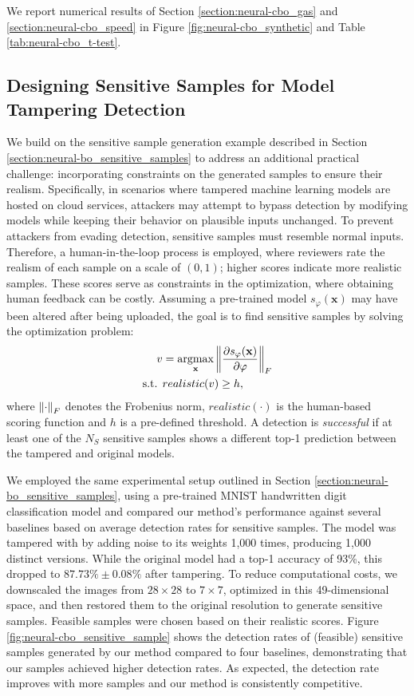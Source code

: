We report numerical results of Section \ref{section:neural-cbo_gas} and  \ref{section:neural-cbo_speed} in Figure \ref{fig:neural-cbo_synthetic} and Table \ref{tab:neural-cbo_t-test}.
\subsection{Designing Sensitive Samples for Model Tampering Detection}
\label{section:neural-cbo_sensitive_sample}


We build on the sensitive sample generation example described in Section \ref{section:neural-bo_sensitive_samples} to address an additional practical challenge: incorporating constraints on the generated samples to ensure their realism. Specifically, in scenarios where tampered machine learning models are hosted on cloud services, attackers may attempt to bypass detection by modifying models while keeping their behavior on plausible inputs unchanged. To prevent attackers from evading detection, sensitive samples must resemble normal inputs. Therefore, a human-in-the-loop process is employed, where reviewers rate the realism of each sample on a scale of $(0,1)$; higher scores indicate more realistic samples. These scores serve as constraints in the optimization, where obtaining human feedback can be costly. Assuming a pre-trained model $s_\varphi(\mathbf{x})$ may have been altered after being uploaded, the goal is to find sensitive samples by solving the optimization problem: 
\begin{align*}
    v &= \operatorname*{argmax}_\mathbf{x} \norm{\frac{\partial s_\varphi(\mathbf{x})}{\partial \varphi}}_F 
    \\
    \text{s.t. } &  realistic(v) \ge h, 
\end{align*}
where $\norm{\cdot}_F$ denotes the Frobenius norm, $realistic(\cdot)$ is the human-based scoring function and $h$ is a pre-defined threshold. A detection is \emph{successful} if at least one of the $N_S$ sensitive samples shows a different top-1 prediction between the tampered and original models.  

We employed the same experimental setup outlined in Section \ref{section:neural-bo_sensitive_samples}, using a pre-trained MNIST handwritten digit classification model and compared our method's performance against several baselines based on average detection rates for sensitive samples. The model was tampered with by adding noise to its weights 1,000 times, producing 1,000 distinct versions. While the original model had a top-1 accuracy of 93\%, this dropped to $87.73\% \pm 0.08\%$ after tampering. To reduce computational costs, we downscaled the images from $28 \times 28$ to $7 \times 7$, optimized in this 49-dimensional space, and then restored them to the original resolution to generate sensitive samples. Feasible samples were chosen based on their realistic scores. Figure \ref{fig:neural-cbo_sensitive_sample} shows the detection rates of (feasible) sensitive samples generated by our method compared to four baselines, demonstrating that our samples achieved higher detection rates. As expected, the detection rate improves with more samples and our method is consistently competitive.




